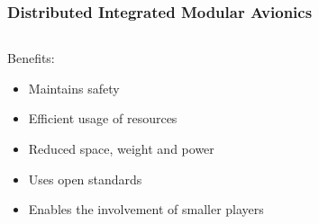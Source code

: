 \documentclass[english, frametitlelogo, mainlogoleft, handout]{beamer}
\begin{document}
\begin{frame}
    \frametitle{Distributed Integrated Modular Avionics}
    \begin{columns}[T]
        \begin{column}{0.4\linewidth}
            Benefits:
            \begin{itemize}
                \item<1-> Maintains safety
                \vspace{10pt}
                \item<2-> Efficient usage of resources
                \vspace{10pt}
                \item<3-> Reduced space, weight and power
                \vspace{10pt}
                \item<4-> Uses open standards
                \vspace{10pt}
                \item<5-> Enables the involvement of smaller players
            \end{itemize}
        \end{column}
        \begin{column}{0.6\linewidth}
            \centering
            \resizebox{\linewidth}{!}{}
        \end{column}
    \end{columns}
\end{frame}
\end{document}
